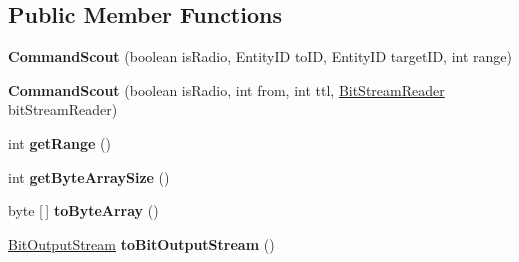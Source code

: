 \subsection*{Public Member Functions}
\begin{DoxyCompactItemize}
\item 
\hypertarget{classadf_1_1agent_1_1communication_1_1standard_1_1bundle_1_1topdown_1_1CommandScout_ac0a0110b57ef6dbb1974ce6162860868}{}\label{classadf_1_1agent_1_1communication_1_1standard_1_1bundle_1_1topdown_1_1CommandScout_ac0a0110b57ef6dbb1974ce6162860868} 
{\bfseries Command\+Scout} (boolean is\+Radio, Entity\+ID to\+ID, Entity\+ID target\+ID, int range)
\item 
\hypertarget{classadf_1_1agent_1_1communication_1_1standard_1_1bundle_1_1topdown_1_1CommandScout_acdf95a514aa45b155b08d4b250343c9b}{}\label{classadf_1_1agent_1_1communication_1_1standard_1_1bundle_1_1topdown_1_1CommandScout_acdf95a514aa45b155b08d4b250343c9b} 
{\bfseries Command\+Scout} (boolean is\+Radio, int from, int ttl, \hyperlink{classadf_1_1component_1_1communication_1_1util_1_1BitStreamReader}{Bit\+Stream\+Reader} bit\+Stream\+Reader)
\item 
\hypertarget{classadf_1_1agent_1_1communication_1_1standard_1_1bundle_1_1topdown_1_1CommandScout_a3fe1b718a7489349c7680862fa533685}{}\label{classadf_1_1agent_1_1communication_1_1standard_1_1bundle_1_1topdown_1_1CommandScout_a3fe1b718a7489349c7680862fa533685} 
int {\bfseries get\+Range} ()
\item 
\hypertarget{classadf_1_1agent_1_1communication_1_1standard_1_1bundle_1_1topdown_1_1CommandScout_aba829e90611691419d59fd26703eee9b}{}\label{classadf_1_1agent_1_1communication_1_1standard_1_1bundle_1_1topdown_1_1CommandScout_aba829e90611691419d59fd26703eee9b} 
int {\bfseries get\+Byte\+Array\+Size} ()
\item 
\hypertarget{classadf_1_1agent_1_1communication_1_1standard_1_1bundle_1_1topdown_1_1CommandScout_a4108b2f1f5146089d06cadcb5a48b718}{}\label{classadf_1_1agent_1_1communication_1_1standard_1_1bundle_1_1topdown_1_1CommandScout_a4108b2f1f5146089d06cadcb5a48b718} 
byte \mbox{[}$\,$\mbox{]} {\bfseries to\+Byte\+Array} ()
\item 
\hypertarget{classadf_1_1agent_1_1communication_1_1standard_1_1bundle_1_1topdown_1_1CommandScout_ae2b5e99f7919c4a445f6f5aafb8c8cd9}{}\label{classadf_1_1agent_1_1communication_1_1standard_1_1bundle_1_1topdown_1_1CommandScout_ae2b5e99f7919c4a445f6f5aafb8c8cd9} 
\hyperlink{classadf_1_1component_1_1communication_1_1util_1_1BitOutputStream}{Bit\+Output\+Stream} {\bfseries to\+Bit\+Output\+Stream} ()

\end{DoxyCompactItemize}
